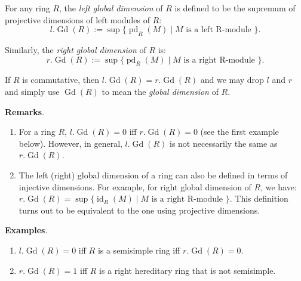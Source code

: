 \documentclass[12pt]{article}
\begin{document}

For any ring $R$, the \emph{left global dimension} of $R$ is defined to be the supremum of projective dimensions of left modules of $R$:
$$l.\operatorname{Gd}(R):=\operatorname{sup}\lbrace\operatorname{pd}_R(M)\mid M\mbox{ is a left R-module }\rbrace.$$

Similarly, the \emph{right global dimension} of $R$ is:
$$r.\operatorname{Gd}(R):=\operatorname{sup}\lbrace\operatorname{pd}_R(M)\mid M\mbox{ is a right R-module }\rbrace.$$

If $R$ is commutative, then $l.\operatorname{Gd}(R)=r.\operatorname{Gd}(R)$ and we may drop $l$ and $r$ and simply use $\operatorname{Gd}(R)$ to mean the \emph{global dimension} of $R$.

\textbf{Remarks}.  
\begin{enumerate}
\item For a ring $R$, $l.\operatorname{Gd}(R)=0$ iff $r.\operatorname{Gd}(R)=0$ (see the first example below).  However, in general, $l.\operatorname{Gd}(R)$ is not necessarily the same as $r.\operatorname{Gd}(R)$.
\item The left (right) global dimension of a ring can also be defined in terms of injective dimensions.  For example, for right global dimension of $R$, we have: $r.\operatorname{Gd}(R)=\operatorname{sup}\lbrace\operatorname{id}_R(M)\mid M\mbox{ is a right R-module }\rbrace$.  This definition turns out to be equivalent to the one using projective dimensions.
\end{enumerate}

\textbf{Examples}.
\begin{enumerate}
\item $l.\operatorname{Gd}(R)=0$ iff $R$ is a semisimple ring iff $r.\operatorname{Gd}(R)=0$.
\item $r.\operatorname{Gd}(R)=1$ iff $R$ is a right hereditary ring that is not semisimple.
\end{enumerate}
\end{document}
